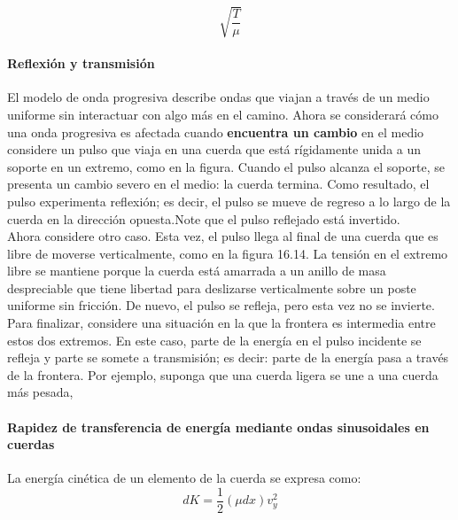\documentclass[10pt]{article}
\begin{document}
\begin{equation*}
    \sqrt{\dfrac{T}{\mu}}
\end{equation*}

\paragraph{Reflexión y transmisión}

El modelo de onda progresiva describe ondas que viajan a través de un medio uniforme sin
interactuar con algo más en el camino. Ahora se considerará cómo una onda progresiva
es afectada cuando \textbf{encuentra un cambio} en el medio\\
\linebreak
considere un pulso que viaja en una cuerda que está rígidamente unida a un soporte en un extremo, como en
la figura. Cuando el pulso alcanza el soporte, se presenta un cambio severo en el medio: la
cuerda termina. Como resultado, el pulso experimenta reflexión; es decir, el pulso se
mueve de regreso a lo largo de la cuerda en la dirección opuesta.Note que el pulso reflejado está invertido.\\
\linebreak
Ahora considere otro caso. Esta vez, el pulso llega al final de una cuerda que es libre
de moverse verticalmente, como en la figura 16.14. La tensión en el extremo libre se mantiene porque la cuerda está amarrada a un anillo de masa despreciable que tiene libertad
para deslizarse verticalmente sobre un poste uniforme sin fricción. De nuevo, el pulso
se refleja, pero esta vez no se invierte. \\
\linebreak
Para finalizar, considere una situación en la que la frontera es intermedia entre estos
dos extremos. En este caso, parte de la energía en el pulso incidente se refleja y parte se
somete a transmisión; es decir: parte de la energía pasa a través de la frontera. Por ejemplo, 
suponga que una cuerda ligera se une a una cuerda más pesada,

\paragraph{Rapidez de transferencia de energía mediante ondas sinusoidales
en cuerdas}

La energía cinética de un elemento de la cuerda se expresa como: 
\begin{equation*}
    dK = \frac{1}{2} (\mu dx) v_y^2
\end{equation*}
\end{document}
